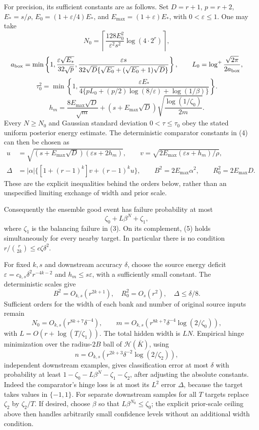 \documentclass[11pt]{article}
\begin{document}
For precision, its sufficient constants are as follows. Set
$D=r+1$, $p=r+2$, $E_*=s/\rho$, $E_0=(1+\varepsilon/4)E_*$,
and $E_{\max}=(1+\varepsilon)E_*$, with $0<\varepsilon\le1$. One may take
\[
 N_0=\left\lceil\frac{128E_0^2}{\varepsilon^2s^2}
                                    \log(4\cdot2^r)\right\rceil,
\]
\[
 a_{\rm box}=\min\left\{1,\frac{\varepsilon\sqrt{E_*}}{32\sqrt p},
 \frac{\varepsilon s}{32\sqrt D\{\sqrt{E_0}+(\sqrt{E_0}+1)\sqrt D\}}\right\},
 \qquad L_0=\log^+\frac{\sqrt{2\pi}}{2a_{\rm box}},
\]
\[
 \tau_0^2=\min\left\{1,
 \frac{\varepsilon E_*}
 {4\{pL_0+(p/2)\log(8/\varepsilon)+\log(1/\beta)\}}\right\}.
\]
\[
 h_m=\frac{8E_{\max}\sqrt D}{\sqrt m}
 +(s+E_{\max}\sqrt D)\sqrt{\frac{\log(1/\zeta_0)}{2m}}.
\]
Every $N\ge N_0$ and Gaussian standard deviation $0<\tau\le\tau_0$
obey the stated uniform posterior energy estimate. The deterministic
comparator constants in (4) can then be chosen as
\[
 \begin{split}
 u&=\sqrt{(s+E_{\max}\sqrt D)(\varepsilon s+2h_m)},\qquad
 v=\sqrt{2E_{\max}(\varepsilon s+h_m)/\rho},\\
 \Delta&=|\alpha|\{[1+(r-1)^k]v+(r-1)^ku\},\qquad
 B^2=2E_{\max}\alpha^2,\qquad R_0^2=2E_{\max}D.
 \end{split}
\]
These are the explicit inequalities behind the orders below, rather
than an unspecified limiting exchange of width and prior scale.

Consequently the ensemble good event has failure probability at most
\[
                         \zeta_0+L\beta^N+\zeta_1,     \tag{8}
\]
where $\zeta_1$ is the balancing failure in (3). On its complement,
(5) holds simultaneously for every nearby target. In particular there
is no condition $r/\binom r{2k}\le c\zeta\delta^2$.

For fixed $k,s$ and downstream accuracy $\delta$, choose the source
energy deficit $\varepsilon=c_{k,s}\delta^2r^{-4k-2}$ and
$h_m\le s\varepsilon$, with a sufficiently small constant. The
deterministic scales give
\[
 B^2=O_{k,s}(r^{2k+1}),\quad R_0^2=O_s(r^2),\quad
 \Delta\le\delta/8.
\]
Sufficient orders for the width of each bank and number of original
source inputs remain
\[
 N_0=O_{k,s}(r^{8k+7}\delta^{-4}),\qquad
 m=O_{k,s}(r^{8k+7}\delta^{-4}\log(2/\zeta_0)),        \tag{9}
\]
with $L=O(r+\log(T/\zeta_1))$. The total hidden width is $LN$.
Empirical hinge minimization over the radius-$2B$ ball of
$\mathcal H(\overline K)$, using
\[
 n=O_{k,s}(r^{2k+3}\delta^{-2}\log(2/\zeta_2)),        \tag{10}
\]
independent downstream examples, gives classification error at most
$\delta$ with probability at least
$1-\zeta_0-L\beta^N-\zeta_1-\zeta_2$, after adjusting the absolute
constants. Indeed the comparator's hinge loss is at most its $L^2$
error $\Delta$, because the target takes values in $\{-1,1\}$.
For separate downstream samples for all $T$ targets replace
$\zeta_2$ by $\zeta_2/T$.
If desired, choose $\beta$ so that $L\beta^{N_0}\le\zeta_0$;
the explicit prior-scale ceiling above then handles arbitrarily small
confidence levels without an additional width condition.
\end{document}
